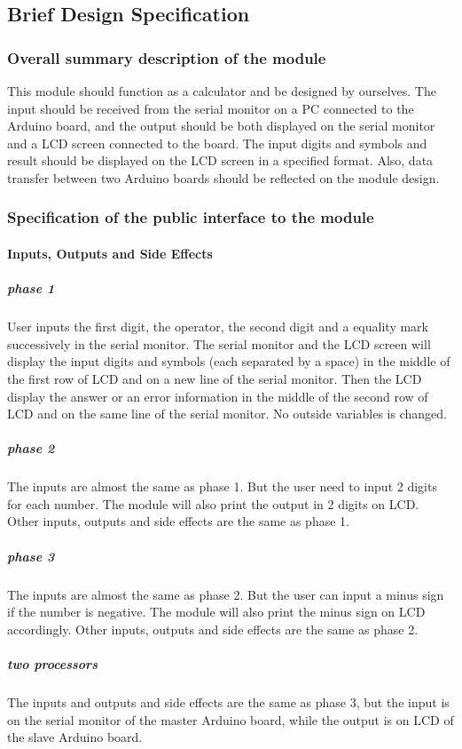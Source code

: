 \subsection{Brief Design Specification}
\subsubsection{Overall summary description of the module}
This module should function as a calculator and be designed by ourselves. The input should be received from the serial monitor on a PC connected to the Arduino board, and the output should be both displayed on the serial monitor and a LCD screen connected to the board. The input digits and symbols and result should be displayed on the LCD screen in a specified format. Also, data transfer between two Arduino boards should be reflected on the module design.
\subsubsection{Specification of the public interface to the module}
\paragraph{Inputs, Outputs and Side Effects}
\subparagraph{phase 1}
User inputs the first digit, the operator, the second digit and a equality mark successively in the serial monitor. The serial monitor and the LCD screen will display the input digits and symbols (each separated by a space) in the middle of the first row of LCD and on a new line of the serial monitor. Then the LCD display the answer or an error information in the middle of the second row of LCD and on the same line of the serial monitor. No outside variables is changed.

\subparagraph{phase 2}
The inputs are almost the same as phase 1. But the user need to input 2 digits for each number. The module will also print the output in 2 digits on LCD. Other inputs, outputs and side effects are the same as phase 1.

\subparagraph{phase 3}
The inputs are almost the same as phase 2. But the user can input a minus sign if the number is negative. The module will also print the minus sign on LCD accordingly. Other inputs, outputs and side effects are the same as phase 2.

\subparagraph{two processors}
The inputs and outputs and side effects are the same as phase 3, but the input is on the serial monitor of the master Arduino board, while the output is on LCD of the slave Arduino board.

